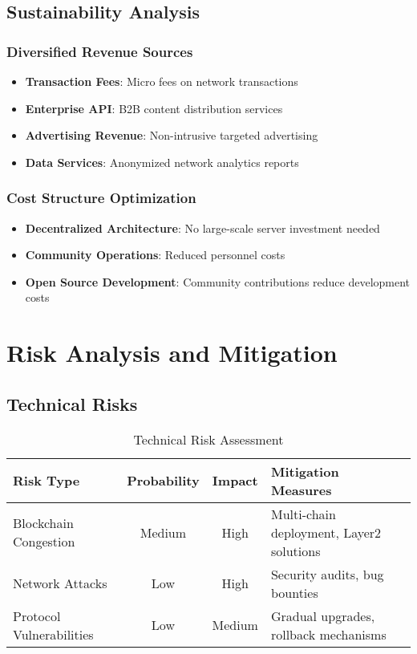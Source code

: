 \documentclass[12pt,a4paper]{article}
\begin{document}
\subsection{Sustainability Analysis}

\subsubsection{Diversified Revenue Sources}
\begin{itemize}
    \item \textbf{Transaction Fees}: Micro fees on network transactions
    \item \textbf{Enterprise API}: B2B content distribution services
    \item \textbf{Advertising Revenue}: Non-intrusive targeted advertising
    \item \textbf{Data Services}: Anonymized network analytics reports
\end{itemize}

\subsubsection{Cost Structure Optimization}
\begin{itemize}
    \item \textbf{Decentralized Architecture}: No large-scale server investment needed
    \item \textbf{Community Operations}: Reduced personnel costs
    \item \textbf{Open Source Development}: Community contributions reduce development costs
\end{itemize}

\section{Risk Analysis and Mitigation}

\subsection{Technical Risks}

\begin{table}[htbp]
\centering
\begin{tabular}{|l|c|c|l|}
\hline
\textbf{Risk Type} & \textbf{Probability} & \textbf{Impact} & \textbf{Mitigation Measures} \\
\hline
Blockchain Congestion & Medium & High & Multi-chain deployment, Layer2 solutions \\
\hline
Network Attacks & Low & High & Security audits, bug bounties \\
\hline
Protocol Vulnerabilities & Low & Medium & Gradual upgrades, rollback mechanisms \\
\hline
\end{tabular}
\caption{Technical Risk Assessment}
\end{table}
\end{document}
